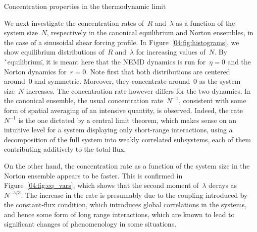     \begin{subsection}{Concentration properties in the thermodynamic limit}\label{04:subsec:numerical_thermo_limit}

    We next investigate the concentration rates of~$R$ and~$\lambda$ as a function of the system size~$N$, respectively in the canonical equilibrium and Norton ensembles, in the case of a sinusoidal shear forcing profile. In Figure~\ref{04:fig:histograms}, we show equilibrium distributions of~$R$ and~$\lambda$ for increasing values of~$N$. By \``equilibrium\", it is meant here that the NEMD dynamics is run for~$\eta=0$ and the Norton dynamics for~$r=0$.
    Note first that both distributions are centered around~0 and symmetric. Moreover, they concentrate around~0 as the system size~$N$ increases. The concentration rate however differs for the two dynamics. In the canonical ensemble, the usual concentration rate~$N^{-1}$, consistent with some form of spatial averaging of an intensive quantity, is observed. Indeed, the rate~$N^{-1}$ is the one dictated by a central limit theorem, which makes sense on an intuitive level for a system displaying only short-range interactions, using a decomposition of the full system into weakly correlated subsystems, each of them contributing additively to the total flux.
    
    On the other hand, the concentration rate as a function of the system size in the Norton ensemble appears to be faster. This is confirmed in Figure~\ref{04:fig:eq_vars}, which shows that the second moment of~$\lambda$ decays as~$N^{-5/3}$. The increase in the rate is presumably due to the coupling introduced by the constant-flux condition, which introduces global correlations in the systems, and hence some form of long range interactions, which are known to lead to significant changes of phenomenology in some situations.


\end{subsection}
